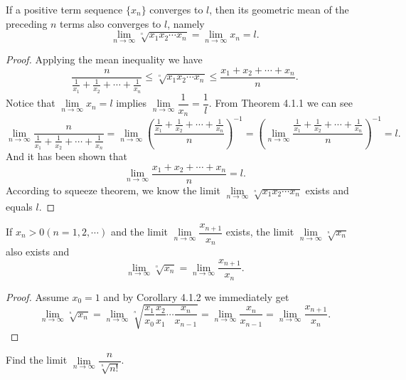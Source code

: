 \documentclass[11pt,fleqn]{book} %
\begin{document}
\begin{corollary}
	If a positive term sequence $\{x_n\}$ converges to $l$, then its geometric mean of the preceding $n$ terms also converges to $l$, namely
	\begin{equation}
	\lim\limits_{n\to\infty}\sqrt[^n]{x_1x_2\cdots x_n}=\lim\limits_{n\to\infty}x_n=l.
	\end{equation}
\end{corollary}

\begin{proof}
	Applying the mean inequality we have
    \[
    \frac{n}{\frac{1}{x_1}+\frac{1}{x_2}+\cdots+\frac{1}{x_n}}\leqslant\sqrt[^n]{x_1x_2\cdots x_n}\leqslant\frac{x_1+x_2+\cdots+x_n}{n}.
    \]
    Notice that $\lim\limits_{n\to\infty}x_n=l$ implies $\lim\limits_{n\to\infty}\dfrac{1}{x_n}=\dfrac{1}{l}$. From Theorem 4.1.1 we can see
    \[
    \lim\limits_{n\to\infty}\frac{n}{\frac{1}{x_1}+\frac{1}{x_2}+\cdots+\frac{1}{x_n}}=\lim\limits_{n\to\infty}\left(\frac{\frac{1}{x_1}+\frac{1}{x_2}+\cdots+\frac{1}{x_n}}{n}\right)^{-1}=\left(\lim\limits_{n\to\infty}\frac{\frac{1}{x_1}+\frac{1}{x_2}+\cdots+\frac{1}{x_n}}{n}\right)^{-1}=l.
    \]
    And it has been shown that
    \[
    \lim\limits_{n\to\infty}\frac{x_1+x_2+\cdots+x_n}{n}=l.
    \]
    According to squeeze theorem, we know the limit $\lim\limits_{n\to\infty}\sqrt[^n]{x_1x_2\cdots x_n}$ exists and equals $l$.
    
     
\end{proof}

\begin{proposition}
	If $x_n>0(n=1,2,\cdots)$ and the limit $\lim\limits_{n\to\infty}\dfrac{x_{n+1}}{x_n}$ exists, the limit $\lim\limits_{n\to\infty}\sqrt[^n]{x_n}$ also exists and
	\[
	\lim\limits_{n\to\infty}\sqrt[^n]{x_n}=\lim\limits_{n\to\infty}\frac{x_{n+1}}{x_n}.
	\]
\end{proposition}

\begin{proof}
    Assume $x_0=1$ and by Corollary 4.1.2 we immediately get
	\[
	\lim\limits_{n\to\infty}\sqrt[^n]{x_n}=\lim\limits_{n\to\infty}\sqrt[^n]{\frac{x_1}{x_0}\frac{x_2}{x_1}\cdots\frac{x_{n}}{x_{n-1}}}=\lim\limits_{n\to\infty}\frac{x_n}{x_{n-1}}=\lim\limits_{n\to\infty}\frac{x_{n+1}}{x_n}.
	\]
\end{proof}

\begin{example}
	Find the limit $\lim\limits_{n\to\infty}\dfrac{n}{\sqrt[^n]{n!}}$.
\end{example}
\end{document}
